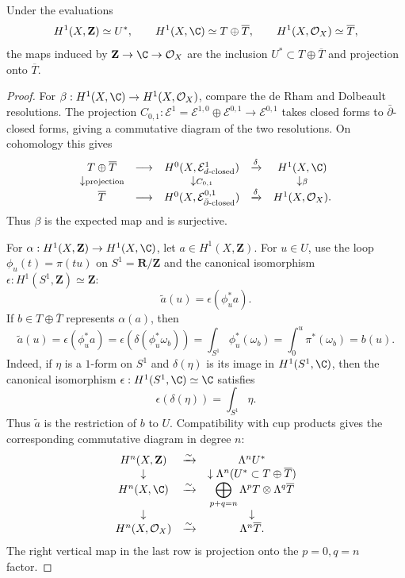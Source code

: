 \begin{proposition}
\label{mumford-frag-comparison}
Under the evaluations
\[
 H^1(X,\mathbf Z)\simeq U^*,\qquad
 H^1(X,\C)\simeq T\oplus\overline T,\qquad
 H^1(X,\mathcal O_X)\simeq\overline T,
\]
the maps induced by $\mathbf Z\to\C\to\mathcal O_X$ are the inclusion
$U^*\subset T\oplus\overline T$ and projection onto $\overline T$.
\end{proposition}
\begin{proof}
For $\beta:H^1(X,\C)\to H^1(X,\mathcal O_X)$, compare the de Rham and
Dolbeault resolutions.  The projection
$C_{0,1}:\mathcal E^1=\mathcal E^{1,0}\oplus\mathcal E^{0,1}\to\mathcal E^{0,1}$
takes closed forms to $\bar\partial$-closed forms, giving a commutative
diagram of the two resolutions.  On cohomology this gives
\[
\begin{array}{ccccc}
T\oplus\overline T&\longrightarrow&H^0(X,\mathcal E^1_{d\text{-closed}})&\xrightarrow{\delta}&H^1(X,\C)\\
\downarrow\scriptstyle{\rm projection}&&\downarrow\scriptstyle{C_{0,1}}&&\downarrow\scriptstyle{\beta}\\
\overline T&\longrightarrow&H^0(X,\mathcal E^{0,1}_{\bar\partial\text{-closed}})&\xrightarrow{\delta}&H^1(X,\mathcal O_X).
\end{array}
\]
Thus $\beta$ is the expected map and is surjective.

For $\alpha:H^1(X,\mathbf Z)\to H^1(X,\C)$, let $a\in H^1(X,\mathbf Z)$.
For $u\in U$, use the loop $\phi_u(t)=\pi(tu)$ on $S^1=\mathbf R/\mathbf Z$
and the canonical isomorphism $\epsilon:H^1(S^1,\mathbf Z)\simeq\mathbf Z$:
\[
 \widetilde a(u)=\epsilon(\phi_u^*a).
\]
If $b\in T\oplus\overline T$ represents $\alpha(a)$, then
\[
 \widetilde a(u)=\epsilon(\phi_u^*a)
 =\epsilon(\delta(\phi_u^*\omega_b))
 =\int_{S^1}\phi_u^*(\omega_b)
 =\int_0^u\pi^*(\omega_b)=b(u).
\]
Indeed, if $\eta$ is a $1$-form on $S^1$ and $\delta(\eta)$ is its image in
$H^1(S^1,\C)$, then the canonical isomorphism
$\epsilon:H^1(S^1,\C)\simeq\C$ satisfies
\[
 \epsilon(\delta(\eta))=\int_{S^1}\eta.
\]
Thus $\widetilde a$ is the restriction of $b$ to $U$.  Compatibility with
cup products gives the corresponding commutative diagram in degree $n$:
\[
\begin{array}{ccccc}
H^n(X,\mathbf Z)&\xrightarrow{\sim}&\Lambda^nU^*\\
\downarrow&&\downarrow\Lambda^n(U^*\subset T\oplus\overline T)\\
H^n(X,\C)&\xrightarrow{\sim}&\displaystyle\bigoplus_{p+q=n}\Lambda^pT\otimes\Lambda^q\overline T\\
\downarrow&&\downarrow\\
H^n(X,\mathcal O_X)&\xrightarrow{\sim}&\Lambda^n\overline T.
\end{array}
\]
The right vertical map in the last row is projection onto the $p=0,q=n$
factor.
\end{proof}


